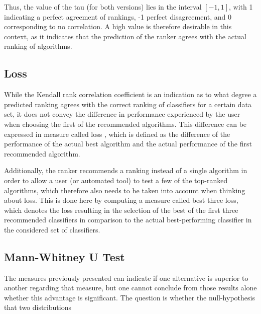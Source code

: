 Thus, the value of the tau (for both versions) lies in the interval $[-1,1]$, with 1 indicating a perfect agreement of rankings, -1 perfect disagreement, and 0 corresponding to no correlation. A high value is therefore desirable in this context, as it indicates that the prediction of the ranker agrees with the actual ranking of algorithms.


\subsection{Loss}
While the Kendall rank correlation coefficient is an indication as to what degree a predicted ranking agrees with the correct ranking of classifiers for a certain data set, it does not convey the difference in performance experienced by the user when choosing the first of the recommended algorithms. This difference can be expressed in measure called loss \cite{DBLP:conf/mldm/LeiteBV12}, which is defined as the difference of the performance of the actual best algorithm and the actual performance of the first recommended algorithm. 

Additionally, the ranker recommends a ranking instead of a single algorithm in order to allow a user (or automated tool) to test a few of the top-ranked algorithms, which therefore also needs to be taken into account when thinking about loss. This is done here by computing a measure called best three loss, which denotes the loss resulting in the selection of the best of the first three recommended classifiers in comparison to the actual best-performing classifier in the considered set of classifiers. 


\subsection{Mann-Whitney U Test}
The measures previously presented can indicate if one alternative is superior to another regarding that measure, but one cannot conclude from those results alone whether this advantage is significant. The question is whether the null-hypothesis that two distributions \cite{mann1947test}
